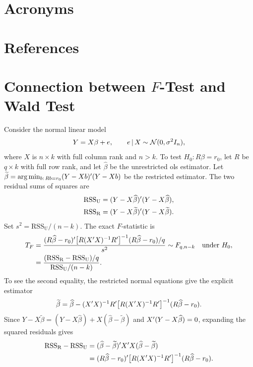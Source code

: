 \documentclass[a4paper,12pt]{article}
\begin{document}
\vfill
\section*{Acronyms}
\printglossaries
\section*{References}
\printbibliography[heading=none]

\clearpage

\appendix
\section{Connection between \texorpdfstring{$F$}{F}-Test and Wald Test}\label{sec-f-test}

Consider the normal linear model
\begin{align}
	Y=X\beta+e,\qquad e\mathpunct{}|\mathpunct{} X\sim\operatorname{\mathcal{N}}(0,\sigma^2 I_n),
\end{align}
where $X$ is $n\times k$ with full column rank and $n>k$.
To test $H_0:R\beta=r_0$, let $R$ be $q\times k$ with full row rank,
and let $\widehat\beta$ be the unrestricted \gls{ols} estimator.
Let $\widetilde\beta=\arg\min_{b:\,Rb=r_0}(Y-Xb)^{\prime}(Y-Xb)$ be the restricted estimator.
The two residual sums of squares are
\begin{align}
	\mathrm{RSS}_{\mathrm U}&=(Y-X\widehat\beta)^{\prime}(Y-X\widehat\beta),\\
	\mathrm{RSS}_{\mathrm R}&=(Y-X\widetilde\beta)^{\prime}(Y-X\widetilde\beta).
\end{align}
Set $s^2=\mathrm{RSS}_{\mathrm U}/(n-k)$.
The exact $F$-statistic is
\begin{align}
	T_F
	&=\frac{(R\widehat\beta-r_0)^{\prime}\big[R(X^{\prime} X)^{-1} R^{\prime}\big]^{-1}(R\widehat\beta-r_0)/q}{s^2}
	\sim F_{q,n-k}\quad\text{under }H_0,\label{eq-f-test}\\
	&=\frac{(\mathrm{RSS}_{\mathrm R}-\mathrm{RSS}_{\mathrm U})/q}{\mathrm{RSS}_{\mathrm U}/(n-k)}.
\end{align}
To see the second equality, the restricted normal equations give the explicit estimator
\begin{align}
	\widetilde\beta
	=\widehat\beta-(X^{\prime} X)^{-1} R^{\prime}\big[R(X^{\prime} X)^{-1} R^{\prime}\big]^{-1}(R\widehat\beta-r_0).
\end{align}
Since $Y-X\widetilde\beta=(Y-X\widehat\beta)+X(\widehat\beta-\widetilde\beta)$
and $X^{\prime}(Y-X\widehat\beta)=0$, expanding the squared residuals gives
\begin{align}
	\mathrm{RSS}_{\mathrm R}-\mathrm{RSS}_{\mathrm U}
	&=(\widehat\beta-\widetilde\beta)^{\prime} X^{\prime} X(\widehat\beta-\widetilde\beta)\\
	&=(R\widehat\beta-r_0)^{\prime}\big[R(X^{\prime} X)^{-1} R^{\prime}\big]^{-1}(R\widehat\beta-r_0).
\end{align}
\end{document}
